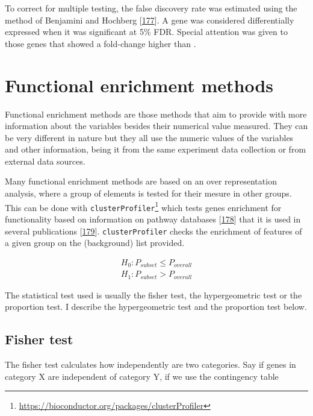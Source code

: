 \documentclass[
  a4paper,
]{book}
\DeclareRobustCommand{\href}[2]{#2\footnote{\url{#1}}}
\begin{document}
To correct for multiple testing, the false discovery rate was estimated using the method of Benjamini and Hochberg {[}\protect\hyperlink{ref-yoavbenjamini}{177}{]}.
A gene was considered differentially expressed when it was significant at 5\% FDR.
Special attention was given to those genes that showed a fold-change higher than \textbar.

\hypertarget{functional-enrichment-methods}{%
\section{Functional enrichment methods}\label{functional-enrichment-methods}}

Functional enrichment methods are those methods that aim to provide with more information about the variables besides their numerical value measured.
They can be very different in nature but they all use the numeric values of the variables and other information, being it from the same experiment data collection or from external data sources.

Many functional enrichment methods are based on an over representation analysis, where a group of elements is tested for their mesure in other groups.
This can be done with \href{https://bioconductor.org/packages/clusterProfiler}{\texttt{clusterProfiler}} which tests genes enrichment for functionality based on information on pathway databases {[}\protect\hyperlink{ref-wu2021}{178}{]} that it is used in several publications {[}\protect\hyperlink{ref-richter2021}{179}{]}.
\texttt{clusterProfiler} checks the enrichment of features of a given group on the (background) list provided.

\[
\begin{aligned}
H_0 : P_{subset} \leq  P_{overall} \\
H_1 : P_{subset} > P_{overall}
\end{aligned}
\]

The statistical test used is usually the fisher test, the hypergeometric test or the proportion test.
I describe the hypergeometric test and the proportion test below.

\hypertarget{fisher-test}{%
\subsection{Fisher test}\label{fisher-test}}

The fisher test calculates how independently are two categories.
Say if genes in category X are independent of category Y, if we use the contingency table
\end{document}
